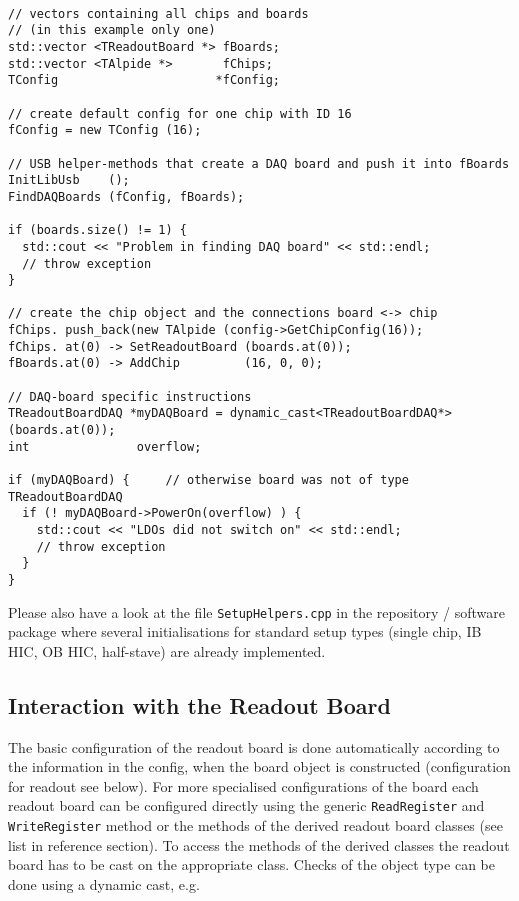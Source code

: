 \documentclass{article}
\begin{document}
\begin{lstlisting}

// vectors containing all chips and boards 
// (in this example only one)
std::vector <TReadoutBoard *> fBoards;
std::vector <TAlpide *>       fChips;
TConfig                      *fConfig;

// create default config for one chip with ID 16
fConfig = new TConfig (16);
 
// USB helper-methods that create a DAQ board and push it into fBoards
InitLibUsb    ();
FindDAQBoards (fConfig, fBoards);
  
if (boards.size() != 1) { 
  std::cout << "Problem in finding DAQ board" << std::endl;
  // throw exception
}

// create the chip object and the connections board <-> chip
fChips. push_back(new TAlpide (config->GetChipConfig(16));
fChips. at(0) -> SetReadoutBoard (boards.at(0));
fBoards.at(0) -> AddChip         (16, 0, 0);

// DAQ-board specific instructions  
TReadoutBoardDAQ *myDAQBoard = dynamic_cast<TReadoutBoardDAQ*> (boards.at(0));
int               overflow;

if (myDAQBoard) {     // otherwise board was not of type TReadoutBoardDAQ
  if (! myDAQBoard->PowerOn(overflow) ) {
    std::cout << "LDOs did not switch on" << std::endl;
    // throw exception
  }
}
\end{lstlisting}


Please also have a look at the  file \texttt{SetupHelpers.cpp} in the repository / software package where several initialisations for standard setup types (single chip, IB HIC, OB HIC, half-stave) are already implemented.

\subsection{Interaction with the Readout Board}

The basic configuration of the readout board is done automatically
according to the information in the config, when the board object is
constructed (configuration for readout see below). For more
specialised configurations of the board  each readout board can be configured directly using the generic
\texttt{ReadRegister} and \texttt{WriteRegister} method or the
methods of the derived readout board classes (see list in
reference section). To access the methods of the derived classes the
readout board has to be cast on the appropriate class. Checks of the
object type can be done using a dynamic cast, e.g. 
\end{document}
